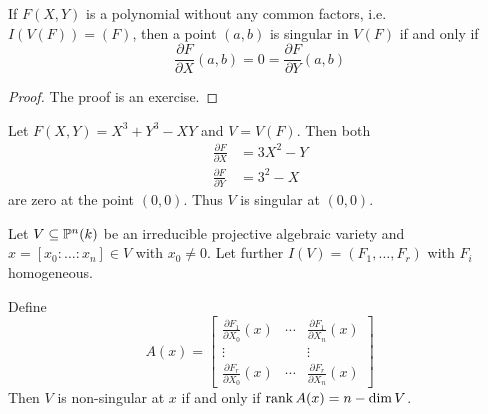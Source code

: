 \begin{corollary}
If $F(X, Y)$ is a polynomial without any common factors, i.e. $I(V(F))=(F)$, then a point $(a, b)$ is singular in $V(F)$ if and only if
\begin{equation*}
    \frac{\partial F}{\partial X}(a, b) = 0 = \frac{\partial F}{\partial Y}(a, b)
\end{equation*}
\end{corollary}
\begin{proof}
The proof is an exercise.
\end{proof}

\begin{example}
Let $F(X, Y) = X^3+Y^3-XY$ and $V=V(F)$. Then both
\begin{align*}
    \frac{\partial F}{\partial X} &= 3X^2-Y \\
    \frac{\partial F}{\partial Y} &= 3^2 -X
\end{align*}
are zero at the point $(0,0)$. Thus $V$ is singular at $(0,0)$. 
\end{example}

\begin{proposition}
Let $V\subseteq \P^n(k)$ be an irreducible projective algebraic variety and $x=[x_0:\ldots:x_n]\in V$ with $x_0\neq 0$. Let further $I(V)=(F_1, \ldots, F_r)$ with $F_i$ homogeneous. 

Define
\begin{equation*}
    A(x) = 
    \begin{bmatrix}
    \frac{\partial F_1}{\partial X_0}(x) &\cdots &\frac{\partial F_1}{\partial X_n}(x) \\
    \vdots & &\vdots \\
    \frac{\partial F_r}{\partial X_0}(x) &\cdots &\frac{\partial F_r}{\partial X_n}(x)
    \end{bmatrix}
\end{equation*}
Then $V$ is non-singular at $x$ if and only if $\rank A(x) = n-\dim V$. 
\end{proposition}

